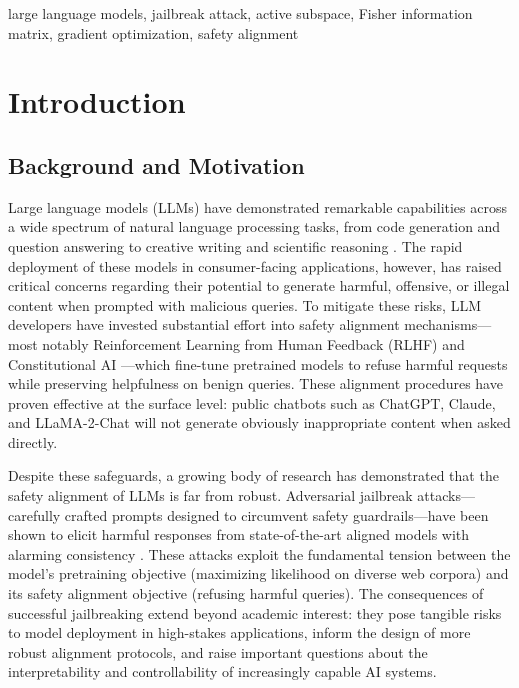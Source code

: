 ﻿\documentclass[lettersize,journal]{IEEEtran}
\begin{document}
\begin{IEEEkeywords}
large language models, jailbreak attack, active subspace, Fisher information matrix, gradient optimization, safety alignment
\end{IEEEkeywords}

\section{Introduction}
\label{sec:introduction}

\subsection{Background and Motivation}
\label{sec:background}

Large language models (LLMs) have demonstrated remarkable capabilities across a wide spectrum of natural language processing tasks, from code generation and question answering to creative writing and scientific reasoning \cite{ouyang2022training, bai2022constitutional}. The rapid deployment of these models in consumer-facing applications, however, has raised critical concerns regarding their potential to generate harmful, offensive, or illegal content when prompted with malicious queries. To mitigate these risks, LLM developers have invested substantial effort into safety alignment mechanisms---most notably Reinforcement Learning from Human Feedback (RLHF) \cite{ouyang2022training} and Constitutional AI \cite{bai2022constitutional}---which fine-tune pretrained models to refuse harmful requests while preserving helpfulness on benign queries. These alignment procedures have proven effective at the surface level: public chatbots such as ChatGPT, Claude, and LLaMA-2-Chat will not generate obviously inappropriate content when asked directly.

Despite these safeguards, a growing body of research has demonstrated that the safety alignment of LLMs is far from robust. Adversarial jailbreak attacks---carefully crafted prompts designed to circumvent safety guardrails---have been shown to elicit harmful responses from state-of-the-art aligned models with alarming consistency \cite{zou2023universal, chao2023jailbreaking, mehrotra2023tree}. These attacks exploit the fundamental tension between the model's pretraining objective (maximizing likelihood on diverse web corpora) and its safety alignment objective (refusing harmful queries). The consequences of successful jailbreaking extend beyond academic interest: they pose tangible risks to model deployment in high-stakes applications, inform the design of more robust alignment protocols, and raise important questions about the interpretability and controllability of increasingly capable AI systems.
\end{document}

